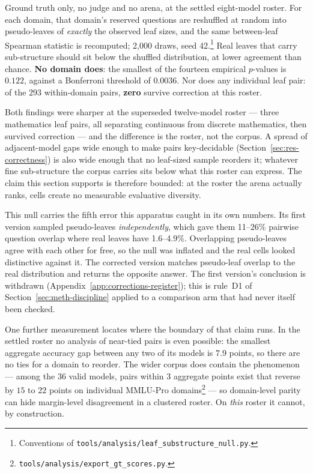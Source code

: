 Ground truth only, no judge and no arena, at the
settled eight-model roster. For each domain, that domain's reserved
questions are reshuffled at random into pseudo-leaves of \emph{exactly}
the observed leaf sizes, and the same between-leaf Spearman statistic
is recomputed; 2{,}000 draws, seed 42.\footnote{Conventions of
\texttt{tools/analysis/leaf\_substructure\_null.py}.} Real leaves that
carry sub-structure should sit below the shuffled distribution, at
lower agreement than chance. \textbf{No domain does}: the smallest of
the fourteen empirical $p$-values is $0.122$, against a Bonferroni
threshold of $0.0036$. Nor does any individual leaf pair: of the $293$
within-domain pairs, \textbf{zero} survive correction at this roster.

Both findings were sharper at the superseded twelve-model roster ---
three mathematics leaf pairs, all separating continuous from discrete
mathematics, then survived correction --- and the difference is the
roster, not the corpus. A spread of adjacent-model gaps wide enough to
make pairs key-decidable (Section~\ref{sec:res-correctness}) is also
wide enough that no leaf-sized sample reorders it; whatever fine
sub-structure the corpus carries sits below what this roster can
express. The claim this section supports is therefore bounded: at the
roster the arena actually ranks, cells create no measurable evaluative
diversity.

This null carries the fifth error this apparatus caught in
its own numbers. Its first version sampled pseudo-leaves
\emph{independently}, which gave them 11--26\% pairwise question
overlap where real leaves have 1.6--4.9\%. Overlapping pseudo-leaves
agree with each other for free, so the null was inflated and the real
cells looked distinctive against it. The corrected version matches
pseudo-leaf overlap to the real distribution and returns the opposite
answer. The first version's conclusion is withdrawn
(Appendix~\ref{app:corrections-register}); this is rule~D1 of
Section~\ref{sec:meth-discipline} applied to a comparison arm that had
never itself been checked.

One further measurement locates where the boundary of that claim
runs. In the settled roster no analysis of near-tied pairs is even
possible: the smallest aggregate accuracy gap between any two of its
models is $7.9$ points, so there are no ties for a domain to reorder.
The wider corpus does contain the phenomenon --- among the $36$ valid
models, pairs within $3$ aggregate points exist that reverse by $15$
to $22$ points on individual MMLU-Pro
domains\footnote{\texttt{tools/analysis/export\_gt\_scores.py}.} ---
so domain-level
parity can hide margin-level disagreement in a clustered roster. On
\emph{this} roster it cannot, by construction.


